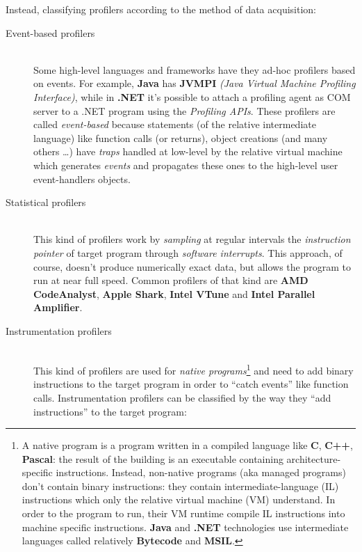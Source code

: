 \documentclass[a4paper,11pt]{report}
\begin{document}
\begin{flushleft}
Instead, classifying profilers according to the method of data acquisition:
\end{flushleft}


\begin{description}
\item[Event-based profilers] \hfill \\
Some high-level languages and frameworks have they ad-hoc profilers based on events. For example, \textbf{Java} has \textbf{JVMPI} \textit{(Java Virtual Machine Profiling Interface)}, while in \textbf{.NET} it's possible to attach a profiling agent as COM server to a .NET program using the \emph{Profiling APIs}. These profilers are called \emph{event-based} because statements (of the relative intermediate language) like function calls (or returns), object creations (and many others \ldots) have \emph{traps} handled at low-level by the relative virtual machine which generates \emph{events} and propagates these ones to the high-level user event-handlers objects.
\item[Statistical profilers] \hfill \\
This kind of profilers work by \emph{sampling} at regular intervals the \emph{instruction pointer} of target program through \emph{software interrupts}. This approach, of course, doesn't produce numerically exact data, but allows the program to run at near full speed. Common profilers of that kind are \textbf{AMD CodeAnalyst}, \textbf{Apple Shark}, \textbf{Intel VTune} and \textbf{Intel Parallel Amplifier}.

\item[Instrumentation profilers] \hfill \\
This kind of profilers are used for \emph{native programs}\footnote{A native program is a program written in a compiled language like \textbf{C}, \textbf{C++}, \textbf{Pascal}: the result of the building is an executable containing architecture-specific instructions. Instead, non-native programs (aka managed programs) don't contain binary instructions: they contain intermediate-language (IL) instructions which only the relative virtual machine (VM) understand. In order to the program to run, their VM runtime compile IL instructions into machine specific instructions. \textbf{Java} and \textbf{.NET} technologies use intermediate languages called relatively \textbf{Bytecode} and \textbf{MSIL}.} and need to add binary instructions to the target program in order to ``catch events'' like function calls. Instrumentation profilers can be classified by the way they ``add instructions'' to the target program:


\end{description}
\end{document}
